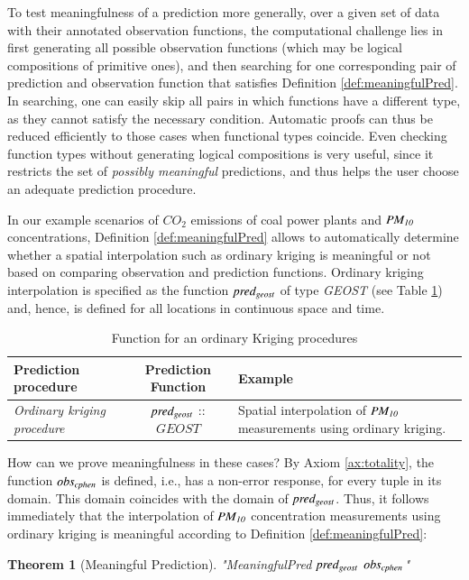 \documentclass[final,authoryear,1p,times]{elsarticle}
\newtheorem{theorem}{Theorem}
\begin{document}
To test meaningfulness of a prediction more generally, over a given set of data with their annotated observation functions, the computational challenge lies in first generating all possible observation functions (which may be logical compositions of primitive ones), and then searching for one corresponding pair of prediction and observation function that satisfies Definition \ref{def:meaningfulPred}. In searching, one can easily skip all pairs in which functions have a different type, as they cannot satisfy the necessary condition. Automatic proofs can thus be reduced efficiently to those cases when functional types coincide. Even checking function types without generating logical compositions is very useful, since it restricts the set of \textit{possibly meaningful} predictions, and thus helps the user choose an adequate prediction procedure. 

In our example scenarios of $CO_2$ emissions of coal power plants and ${\it PM_{10}}$ concentrations, Definition \ref{def:meaningfulPred} allows to automatically determine whether a spatial interpolation such as ordinary kriging is meaningful or not based on comparing observation and prediction functions. Ordinary kriging interpolation is specified as the function ${\it pred_{geost}}$ of type \textit{GEOST} (see Table \ref{tab:prediction}) and, hence, is defined for all locations in continuous space and time. 

\begin{table}[htb]
\caption{Function for an ordinary Kriging procedures}
\label{tab:prediction}
\begin{tabular}[h]{|p{3.5cm}|c|p{5cm}|}
			\hline
			\textbf{Prediction procedure} & \textbf{Prediction Function} &  \textbf{Example} \\
			\hline
			\textit{Ordinary kriging procedure} & ${\it pred_{geost}}$ :: $GEOST$ &  Spatial interpolation of ${\it PM_{10}}$ measurements using ordinary kriging. \\
			\hline
\end{tabular}
\end{table}

How can we prove meaningfulness in these cases? By Axiom \ref{ax:totality}, the function ${\it obs_{cphen}}$ is defined, i.e., has a non-error response, for every tuple in its domain. This domain coincides with the domain of ${\it pred_{geost}}$. Thus, it follows immediately that the interpolation of ${\it PM_{10}}$ concentration measurements using ordinary kriging is meaningful according to Definition \ref{def:meaningfulPred}: 
\begin{theorem}[Meaningful Prediction]
\label{the:Meaningful}
"MeaningfulPred ${\it pred_{geost}}$  ${\it obs_{cphen}}$"
\end{theorem}
\end{document}
